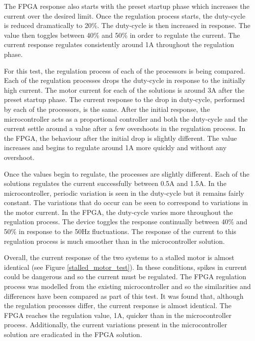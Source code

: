 The FPGA response also starts with the preset startup phase which increases the current over the desired limit. Once the regulation process starts, the duty-cycle is reduced dramatically to 20\%. The duty-cycle is then increased in response. The value then toggles between 40\% and 50\% in order to regulate the current. The current response regulates consistently around 1A throughout the regulation phase.

For this test, the regulation process of each of the processors is being compared. Each of the regulation processes drops the duty-cycle in response to the initially high current. The motor current for each of the solutions is around 3A after the preset startup phase. The current response to the drop in duty-cycle, performed by each of the processors, is the same. After the initial response, the microcontroller acts as a proportional controller and both the duty-cycle and the current settle around a value after a few overshoots in the regulation process. In the FPGA, the behaviour after the initial drop is slightly different. The value increases and begins to regulate around 1A more quickly and without any overshoot. 

Once the values begin to regulate, the processes are slightly different. Each of the solutions regulates the current successfully between 0.5A and 1.5A. In the microcontroller, periodic variation is seen in the duty-cycle but it remains fairly constant. The variations that do occur can be seen to correspond to variations in the motor current. In the FPGA, the duty-cycle varies more throughout the regulation process. The device toggles the response continually between 40\% and 50\% in response to the 50Hz fluctuations. The response of the current to this regulation process is much smoother than in the microcontroller solution.  

Overall, the current response of the two systems to a stalled motor is almost identical (see Figure \ref{stalled_motor_test}). In these conditions, spikes in current could be dangerous and so the current must be regulated. The FPGA regulation process was modelled from the existing microcontroller and so the similarities and differences have been compared as part of this test. It was found that, although the regulation processes differ, the current response is almost identical. The FPGA reaches the regulation value, 1A, quicker than in the microcontroller process. Additionally, the current variations present in the microcontroller solution are eradicated in the FPGA solution.

